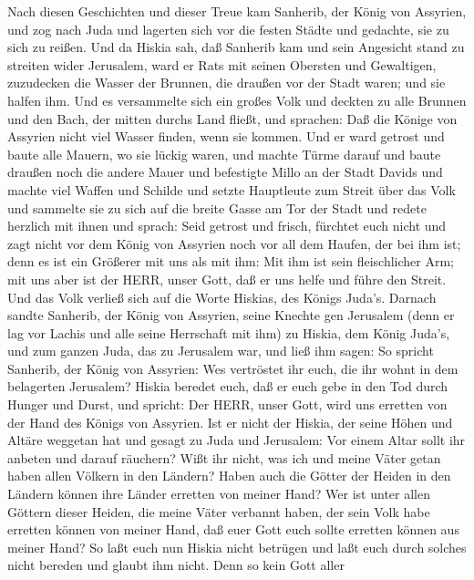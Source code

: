  Nach diesen Geschichten und dieser Treue kam Sanherib, der
König von Assyrien, und zog nach Juda und lagerten sich vor die festen
Städte und gedachte, sie zu sich zu reißen.  Und da Hiskia
sah, daß Sanherib kam und sein Angesicht stand zu streiten wider
Jerusalem,  ward er Rats mit seinen Obersten und Gewaltigen,
zuzudecken die Wasser der Brunnen, die draußen vor der Stadt waren; und
sie halfen ihm.  Und es versammelte sich ein großes Volk und
deckten zu alle Brunnen und den Bach, der mitten durchs Land fließt, und
sprachen: Daß die Könige von Assyrien nicht viel Wasser finden, wenn sie
kommen.  Und er ward getrost und baute alle Mauern, wo sie
lückig waren, und machte Türme darauf und baute draußen noch die andere
Mauer und befestigte Millo an der Stadt Davids und machte viel Waffen
und Schilde  und setzte Hauptleute zum Streit über das Volk
und sammelte sie zu sich auf die breite Gasse am Tor der Stadt und
redete herzlich mit ihnen und sprach:  Seid getrost und
frisch, fürchtet euch nicht und zagt nicht vor dem König von Assyrien
noch vor all dem Haufen, der bei ihm ist; denn es ist ein Größerer mit
uns als mit ihm:  Mit ihm ist sein fleischlicher Arm; mit
uns aber ist der HERR, unser Gott, daß er uns helfe und führe den
Streit. Und das Volk verließ sich auf die Worte Hiskias, des Königs
Juda's.  Darnach sandte Sanherib, der König von Assyrien,
seine Knechte gen Jerusalem (denn er lag vor Lachis und alle seine
Herrschaft mit ihm) zu Hiskia, dem König Juda's, und zum ganzen Juda,
das zu Jerusalem war, und ließ ihm sagen:  So spricht
Sanherib, der König von Assyrien: Wes vertröstet ihr euch, die ihr wohnt
in dem belagerten Jerusalem?  Hiskia beredet euch, daß er
euch gebe in den Tod durch Hunger und Durst, und spricht: Der HERR,
unser Gott, wird uns erretten von der Hand des Königs von Assyrien.
 Ist er nicht der Hiskia, der seine Höhen und Altäre
weggetan hat und gesagt zu Juda und Jerusalem: Vor einem Altar sollt ihr
anbeten und darauf räuchern?  Wißt ihr nicht, was ich und
meine Väter getan haben allen Völkern in den Ländern? Haben auch die
Götter der Heiden in den Ländern können ihre Länder erretten von meiner
Hand?  Wer ist unter allen Göttern dieser Heiden, die meine
Väter verbannt haben, der sein Volk habe erretten können von meiner
Hand, daß euer Gott euch sollte erretten können aus meiner Hand?
 So laßt euch nun Hiskia nicht betrügen und laßt euch durch
solches nicht bereden und glaubt ihm nicht. Denn so kein Gott aller
